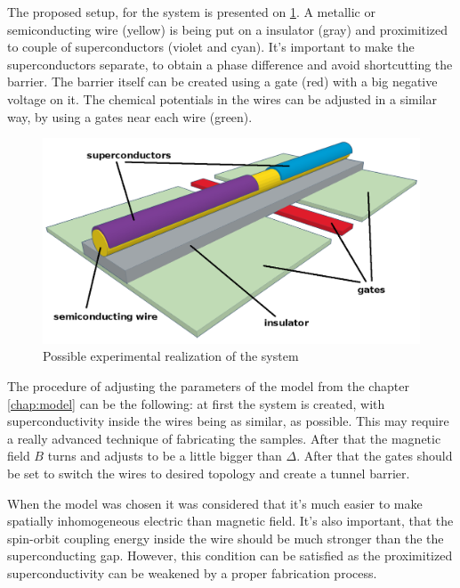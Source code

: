The proposed  setup, for the system is presented on \ref{fig:realmodel3}.  A metallic or semiconducting wire (yellow) is being put on a insulator (gray) and proximitized to couple of superconductors (violet and cyan). It's important to make the superconductors separate, to obtain a phase difference and avoid shortcutting the barrier. The barrier itself can be created using a gate (red) with a big negative voltage on it.
The chemical potentials in the wires can be adjusted in a similar way, by using a gates near each wire (green).
\begin{figure}[H]
	\centering
	\includegraphics[width=0.7\linewidth]{images/real_model_3}
	\caption{Possible experimental realization of the system}
	\label{fig:realmodel3}
\end{figure}
The procedure of adjusting the parameters of the model from the chapter \ref{chap:model} can be the following: at first the system is created, with superconductivity inside the wires being as similar, as possible. This may require a really advanced technique of fabricating the samples. After that the magnetic field $ B $ turns and adjusts to be a little bigger than $ \Delta $. After that the gates should be set to switch the wires to desired topology and create a tunnel barrier.

When the model was chosen it was considered that it's much easier to make spatially inhomogeneous electric than magnetic field. It's also important, that the spin-orbit coupling energy inside the wire should be much stronger than the the superconducting gap. However, this condition can be satisfied as the proximitized superconductivity can be weakened	 by a proper fabrication process.